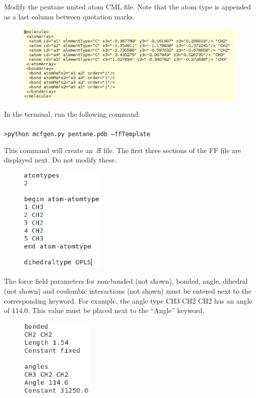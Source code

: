 \vspace{3in}
Modify the pentane united atom CML file. Note that the atom type is appended as a last
column between quotation marks.

\begin{figure}[h]
\begin{center}
\includegraphics[height=1.5in]{pentane_cml_modified.eps}
\end{center}
\end{figure}

In the terminal, run the following command:\\ \\
\texttt{>python mcfgen.py pentane.pdb --ffTemplate}

This command will create an .ff file. The first three sections of the FF file are displayed next. 
Do not modify these.

\begin{figure}[h]
\begin{center}
\includegraphics[height=2in]{top_ff.eps}
\end{center}
\end{figure}

The force field parameters for non-bonded (not shown), bonded, angle, dihedral (not shown)
and coulombic interactions (not shown) must be entered next to the corresponding keyword.
For example, the angle type CH3 CH2 CH2 has an angle of 114.0. This value must be placed
next to the ``Angle'' keyword.

\begin{figure}[h]
\begin{center}
\includegraphics[height=1.5in]{body_ff.eps}
\end{center}
\end{figure}

